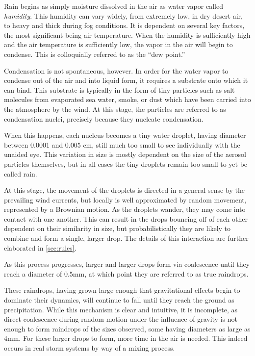 \documentclass[twocolumn,a4paper,10pt]{article}
\begin{document}
Rain begins as simply moisture dissolved in the air as water vapor called
\emph{humidity}.  This humidity can vary widely, from extremely low, in dry
desert air, to heavy and thick during fog conditions. It is dependent on several
key factors, the most significant being air temperature\citet{hu1998}. When the
humidity is sufficiently high and the air temperature is sufficiently low, the
vapor in the air will begin to condense. This is colloquially referred to as the
``dew point.''

Condensation is not spontaneous, however. In order for the water vapor to
condense out of the air and into liquid form, it requires a substrate onto which
it can bind.  This substrate is typically in the form of tiny particles such as
salt molecules from evaporated sea water, smoke, or dust which have been carried
into the atmosphere by the wind. At this stage, the particles are referred to as
condensation nuclei, precisely because they nucleate condensation.

When this happens, each nucleus becomes a tiny water droplet, having diameter
between 0.0001 and 0.005 cm, still much too small to see individually with the
unaided eye. This variation in size is mostly dependent on the size of the
aerosol particles themselves, but in all cases the tiny droplets remain too
small to yet be called rain.

At this stage, the movement of the droplets is directed in a general sense by
the prevailing wind currents, but locally is well approximated by random
movement, represented by a Brownian motion. As the droplets wander, they may
come into contact with one another. This can result in the drops bouncing off of
each other dependent on their similarity in size, but probabilistically they
are likely to combine and form a single, larger drop. The details of this
interaction are further elaborated in \autoref{sec:rules}.

As this process progresses, larger and larger drops form via coalescence until
they reach a diameter of 0.5mm, at which point they are referred to as true
raindrops.

These raindrops, having grown large enough that gravitational effects begin to
dominate their dynamics, will continue to fall until they reach the ground as
precipitation. While this mechanism is clear and intuitive, it is incomplete, as
direct coalescence during random motion under the influence of gravity is not
enough to form raindrops of the sizes observed, some having diameters as large
as 4mm. For these larger drops to form, more time in the air is needed. This
indeed occurs in real storm systems by way of a mixing process.
\end{document}
